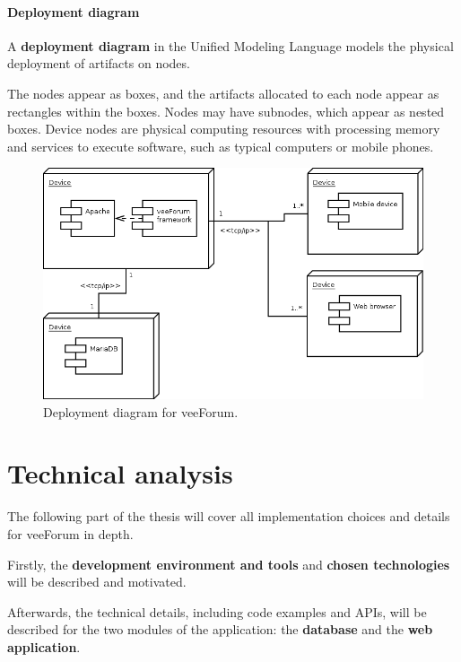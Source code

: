 \documentclass[12pt]{report}
\renewcommand\emph{\textbf}
\begin{document}
                    \newpage

                \subsection{Deployment diagram}

                    A \emph{deployment diagram} in the Unified Modeling Language models the physical deployment of artifacts on nodes.

                    The nodes appear as boxes, and the artifacts allocated to each node appear as rectangles within the boxes. Nodes may have subnodes, which appear as nested boxes. Device nodes are physical computing resources with processing memory and services to execute software, such as typical computers or mobile phones. 

                    \begin{figure}[H]
                    \caption{Deployment diagram for veeForum.}
                    \centering
                    \includegraphics[width=1\textwidth]{deployment}
                    \end{figure}

    \part{Technical analysis}
        The following part of the thesis will cover all implementation choices and details for veeForum in depth.

        Firstly, the \emph{development environment and tools} and \emph{chosen technologies} will be described and motivated.

        Afterwards, the technical details, including code examples and APIs, will be described for the two modules of the application: the \emph{database} and the \emph{web application}.
\end{document}
